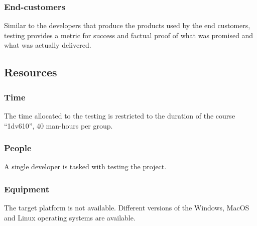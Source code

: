 \subsubsection{End-customers}
Similar to the developers that produce the products used by the end customers,
testing provides a metric for success and factual proof of what was promised
and what was actually delivered.


\subsection{Resources}
\subsubsection{Time}
The time allocated to the testing is restricted to the duration of the course
``1dv610'', 40 man-hours per group.


\subsubsection{People}
A single developer is tasked with testing the project. 


\subsubsection{Equipment}
The target platform is not available. Different versions of the Windows, MacOS
and Linux operating systems are available.
